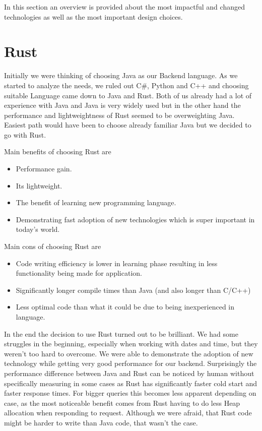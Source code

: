 In this section an overview is provided about the most impactful and changed technologies as well as the most important design choices.

\section{Rust}\label{sec:rust}
Initially we were thinking of choosing Java as our Backend language.
As we started to analyze the needs, we ruled out C\#, Python and C++ and choosing suitable Language came down to Java and Rust.
Both of us already had a lot of experience with Java and Java is very widely used but in the other hand the performance and lightweightness of Rust seemed to be overweighting Java.
Easiest path would have been to choose already familiar Java but we decided to go with Rust.

Main benefits of choosing Rust are
\begin{itemize}
    \item Performance gain.
    \item Its lightweight.
    \item The benefit of learning new programming language.
    \item Demonstrating fast adoption of new technologies which is super important in today's world.
\end{itemize}

Main cons of choosing Rust are
\begin{itemize}
    \item Code writing efficiency is lower in learning phase resulting in less functionality being made for application.
    \item Significantly longer compile times than Java (and also longer than C/C++)
    \item Less optimal code than what it could be due to being inexperienced in language.
\end{itemize}

In the end the decision to use Rust turned out to be brilliant.
We had some struggles in the beginning, especially when working with dates and time, but they weren't too hard to overcome.
We were able to demonstrate the adoption of new technology while getting very good performance for our backend.
Surprisingly the performance difference between Java and Rust can be noticed by human without specifically measuring in some cases
as Rust has significantly faster cold start and faster response times.
For bigger queries this becomes less apparent depending on case, as the most noticeable benefit comes from Rust
having to do less Heap allocation when responding to request.
Although we were afraid, that Rust code might be harder to write than Java code, that wasn't the case.


